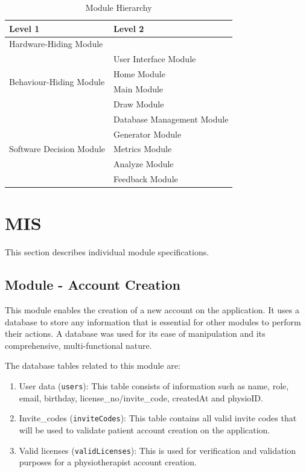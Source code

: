 \documentclass[12pt, titlepage]{article}
\begin{document}
\begin{table}[h!]
\centering
\begin{tabular}{p{} p{}}
\toprule
\textbf{Level 1} & \textbf{Level 2}\\
\midrule

{Hardware-Hiding Module} & ~ \\
\midrule

\multirow{4}{0.3\textwidth}{Behaviour-Hiding Module}& User Interface Module\\
& Home Module\\
& Main Module\\
& Draw Module \\
\midrule

\multirow{5}{0.3\textwidth}{Software Decision Module} & Database Management Module\\
& Generator Module\\
& Metrics Module\\
& Analyze Module\\
& Feedback Module\\
\bottomrule

\end{tabular}
\caption{Module Hierarchy}
\label{TblMH}
\end{table}


\section{MIS}
This section describes individual module specifications.\\

\subsection{Module - Account Creation}
This module enables the creation of a new account on the application. It uses a database to store any information that 
is essential for other modules to perform their actions. A database was used for its ease of manipulation and its 
comprehensive, multi-functional nature. 

\noindent The database tables related to this module are:
\begin{enumerate}
  \item User data (\texttt{users}): This table consists of information such as name,
  role, email, birthday, license\_no/invite\_code, createdAt and physioID.
  \item Invite\_codes (\texttt{inviteCodes}): This table contains all valid invite codes that will be used to validate 
  patient account creation on the application.
  \item Valid licenses (\texttt{validLicenses}): This is used for verification and validation purposes for a physiotherapist
  account creation.
\end{enumerate}  
\end{document}

